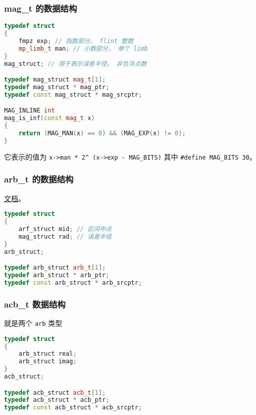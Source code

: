 \subsubsection{mag\_t 的数据结构}
\begin{lstlisting}[language=cpp]
typedef struct
{
    fmpz exp; // 指数部分， flint 整数
    mp_limb_t man; // 小数部分， 单个 limb
}
mag_struct; // 用于表示误差半径， 非负浮点数

typedef mag_struct mag_t[1];
typedef mag_struct * mag_ptr;
typedef const mag_struct * mag_srcptr;

MAG_INLINE int
mag_is_inf(const mag_t x)
{
    return (MAG_MAN(x) == 0) && (MAG_EXP(x) != 0);
}
\end{lstlisting}

它表示的值为 \verb|x->man * 2^ (x->exp - MAG_BITS)| 其中 \verb|#define MAG_BITS 30|。 %

\subsubsection{arb\_t 的数据结构}
\href{https://arblib.org/arb.html}{文档}。

\begin{lstlisting}[language=cpp]
typedef struct
{
    arf_struct mid; // 区间中点
    mag_struct rad; // 误差半径
}
arb_struct;

typedef arb_struct arb_t[1];
typedef arb_struct * arb_ptr;
typedef const arb_struct * arb_srcptr;
\end{lstlisting}

\subsubsection{acb\_t 数据结构}
就是两个 \verb|arb| 类型
\begin{lstlisting}[language=cpp]
typedef struct
{
    arb_struct real;
    arb_struct imag;
}
acb_struct;

typedef acb_struct acb_t[1];
typedef acb_struct * acb_ptr;
typedef const acb_struct * acb_srcptr;
\end{lstlisting}
